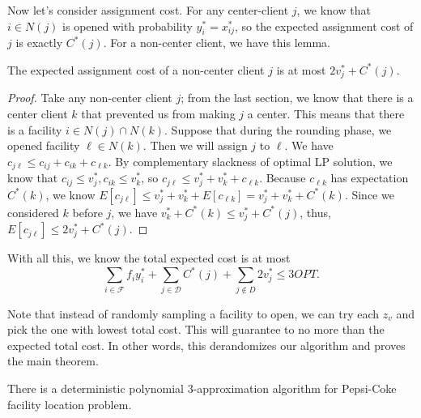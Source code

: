 Now let's consider assignment cost. For any center-client $j$,
we know that $i \in N(j)$ is opened with probability $y^*_i = x^*_{ij}$,
so the expected assignment cost of $j$ is exactly $C^*(j)$. For a non-center client, we have this lemma.

\begin{lem}
The expected assignment cost of a non-center client $j$ is at most
$2 v^*_j + C^*(j)$.
\end{lem}
\begin{proof}
Take any non-center client $j$; from the last section, we know that there is a center client $k$
that prevented us from making $j$ a center. This means that there is a facility $i \in N(j) \cap N(k)$.
Suppose that during the rounding phase, we opened facility $\ell \in N(k)$. Then we will assign $j$ to
$\ell$. 
We have $c_{j\ell} \le c_{ij} + c_{ik} + c_{\ell k}$.
By complementary slackness of optimal LP solution, we know that $c_{ij} \le v^*_j, c_{ik}\le v^*_k$, so
$c_{j\ell } \le v^*_j + v^*_k + c_{\ell k}$.
Because $c_{\ell k}$ has expectation $C^*(k)$, we know
$E [c_{j\ell }] \le v^*_j + v^*_k + E [c_{\ell k}] = v^*_j + v^*_k + C^*(k)$.
Since we considered $k$ before $j$, we have $v^*_k + C^*(k) \le v^*_j + C^*(j)$, thus,
$E [c_{j\ell}] \le 2v^*_j + C^*(j)$.
\end{proof}

With all this, we know the total expected cost is at most
\[  \sum_{i \in \mathcal{F}} f_i y^*_i + \sum_{j \in \mathcal{D}} C^*(j) + \sum_{j \not \in D} 2v^*_j
\le 3 OPT .   \]

Note that instead of randomly sampling a facility to open, we can try each $z_v$ and pick the one
with lowest total cost. This will guarantee to no more than the expected total cost.
In other words, this derandomizes our algorithm and proves the main theorem.

\begin{thm}
There is a deterministic polynomial 3-approximation algorithm for Pepsi-Coke facility location problem.
\end{thm}
